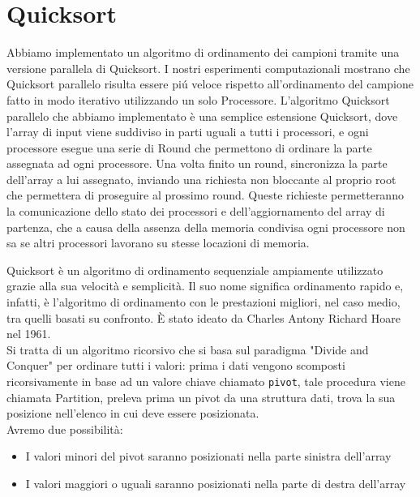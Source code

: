\chapter{Quicksort}
Abbiamo implementato un algoritmo di ordinamento dei campioni tramite una versione parallela di Quicksort.
I nostri esperimenti computazionali mostrano che Quicksort parallelo risulta essere piú veloce rispetto all'ordinamento del campione fatto in modo iterativo utilizzando un solo  Processore.
L'algoritmo Quicksort parallelo che abbiamo implementato è una semplice estensione Quicksort, dove l'array di input viene suddiviso in parti uguali a tutti i processori, e ogni processore esegue una serie di Round che permettono di ordinare la parte assegnata ad ogni processore.
Una volta finito un round, sincronizza la parte dell'array a lui assegnato, inviando una richiesta non bloccante al proprio root che permettera di proseguire al prossimo round. Queste richieste permetteranno la comunicazione dello stato dei processori e dell'aggiornamento del array di partenza, che a causa della assenza della memoria condivisa ogni processore non sa se altri processori lavorano su stesse locazioni di memoria.


Quicksort è un algoritmo di ordinamento sequenziale ampiamente utilizzato grazie alla sua velocità e semplicità. Il suo nome significa ordinamento rapido e, infatti, è l'algoritmo di ordinamento con le prestazioni migliori, nel caso medio, tra quelli basati su confronto. È stato ideato da Charles Antony Richard Hoare nel 1961.\\ 
Si tratta di un algoritmo ricorsivo che si basa sul paradigma "Divide and Conquer" per ordinare tutti i valori: prima i dati vengono scomposti ricorsivamente in base ad un valore chiave chiamato \texttt{pivot}, tale procedura viene chiamata Partition, preleva prima un pivot da una struttura dati, trova la sua posizione nell'elenco in cui deve essere posizionata. \\
Avremo due possibilità:
\begin{itemize}
\item I valori minori del pivot saranno posizionati nella parte sinistra dell'array
\item I valori maggiori o uguali saranno posizionati nella parte di destra dell'array
\end{itemize}

